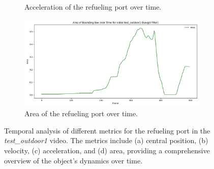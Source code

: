 \documentclass[12pt,oneside]{book} %
\begin{document}
\begin{figure}[H]
\begin{subfigure}[t]{0.6\textwidth}
        \caption{Acceleration of the refueling port over time.}
        \label{fig:acceleration-test-outdoor1-savgol}
    \end{subfigure}
    \hfill
    \begin{subfigure}[t]{0.6\textwidth}
        \includegraphics[width=\textwidth]{figures/bbox_metrics/test_outdoor1 (Savgol Filter)_area.png}
        \caption{Area of the refueling port over time.}
        \label{fig:size-test-outdoor1-savgol}
    \end{subfigure}
    \caption{Temporal analysis of different metrics for the refueling port in the \textit{test\_outdoor1} video. The metrics include (a) central position, (b) velocity, (c) acceleration, and (d) area, providing a comprehensive overview of the object's dynamics over time.}
    \label{fig:bbox-metrics-test-outdoor1-savgol}
\end{figure}
\end{document}
